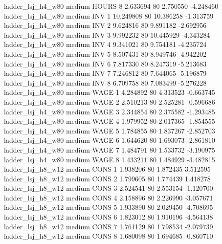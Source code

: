   ladder_lsj_h4_w80     medium    HOURS                 8  2.633694 80       2.750550          -4.248460
  ladder_lsj_h4_w80     medium      INV                 1 10.249808 80      10.386258          -1.313759
  ladder_lsj_h4_w80     medium      INV                 2  9.624816 80       9.891182          -2.692956
  ladder_lsj_h4_w80     medium      INV                 3  9.992232 80      10.445929          -4.343284
  ladder_lsj_h4_w80     medium      INV                 4  9.341021 80       9.754181          -4.235724
  ladder_lsj_h4_w80     medium      INV                 5  8.507431 80       8.949746          -4.942202
  ladder_lsj_h4_w80     medium      INV                 6  7.817330 80       8.247319          -5.213683
  ladder_lsj_h4_w80     medium      INV                 7  7.246812 80       7.644065          -5.196879
  ladder_lsj_h4_w80     medium      INV                 8  6.709758 80       7.083499          -5.276228
  ladder_lsj_h4_w80     medium     WAGE                 1  4.284892 80       4.313523          -0.663745
  ladder_lsj_h4_w80     medium     WAGE                 2  2.510213 80       2.525281          -0.596686
  ladder_lsj_h4_w80     medium     WAGE                 3  2.344854 80       2.375582          -1.293485
  ladder_lsj_h4_w80     medium     WAGE                 4  1.979952 80       2.017365          -1.854555
  ladder_lsj_h4_w80     medium     WAGE                 5  1.784855 80       1.837267          -2.852703
  ladder_lsj_h4_w80     medium     WAGE                 6  1.644620 80       1.693073          -2.861810
  ladder_lsj_h4_w80     medium     WAGE                 7  1.484791 80       1.533732          -3.190975
  ladder_lsj_h4_w80     medium     WAGE                 8  1.433211 80       1.484929          -3.482815
  ladder_lsj_h8_w12     medium     CONS                 1  1.938206 80       1.872435           3.512595
  ladder_lsj_h8_w12     medium     CONS                 2  1.799605 80       1.774439           1.418278
  ladder_lsj_h8_w12     medium     CONS                 3  2.524541 80       2.553154          -1.120700
  ladder_lsj_h8_w12     medium     CONS                 4  2.158896 80       2.226990          -3.057671
  ladder_lsj_h8_w12     medium     CONS                 5  1.933890 80       2.029450          -4.708695
  ladder_lsj_h8_w12     medium     CONS                 6  1.823012 80       1.910196          -4.564138
  ladder_lsj_h8_w12     medium     CONS                 7  1.761129 80       1.798534          -2.079739
  ladder_lsj_h8_w12     medium     CONS                 8  1.680098 80       1.694685          -0.860710
